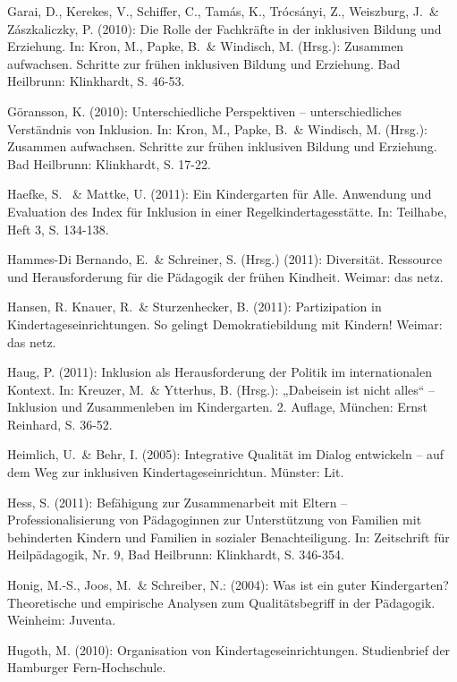 Garai, D., Kerekes, V., Schiffer, C., Tamás,
K., Trócsányi, Z., Weiszburg, J.~\& Zászkaliczky, P. (2010):
Die Rolle der Fachkräfte in der inklusiven Bildung und
Erziehung. In: Kron, M., Papke, B.~\& Windisch, M. (Hrsg.): Zusammen aufwachsen. Schritte zur frühen inklusiven Bildung und Erziehung. Bad Heilbrunn: Klinkhardt, S. 46-53.

Göransson, K. (2010): Unterschiedliche Perspektiven – unterschiedliches Verständnis von Inklusion. In: Kron, M., Papke, B.~\& Windisch, M. (Hrsg.): Zusammen aufwachsen. Schritte zur frühen inklusiven Bildung und Erziehung. Bad Heilbrunn: Klinkhardt, S. 17-22. 

Haefke, S. ~\& Mattke, U. (2011): Ein Kindergarten für Alle. Anwendung und Evaluation des Index für Inklusion in einer Regelkindertagesstätte. In: Teilhabe, Heft 3, S. 134-138.

Hammes-Di Bernando, E.~\& Schreiner, S. (Hrsg.) (2011): Diversität. Ressource und Herausforderung für die Pädagogik der frühen Kindheit. Weimar: das netz. 

Hansen, R. Knauer, R.~\& Sturzenhecker, B. (2011): Partizipation in Kindertageseinrichtungen. So gelingt Demokratiebildung mit Kindern! Weimar: das netz.

Haug, P. (2011): Inklusion als Herausforderung der Politik im internationalen Kontext. In: Kreuzer, M.~\& Ytterhus, B. (Hrsg.): „Dabeisein ist nicht alles“ -- Inklusion und Zusammenleben im Kindergarten. 2. Auflage, München: Ernst Reinhard, S. 36-52.   

Heimlich, U.~\& Behr, I. (2005): Integrative Qualität im Dialog entwickeln – auf dem Weg zur inklusiven Kindertageseinrichtun. Münster: Lit. 


Hess, S. (2011): Befähigung zur Zusammenarbeit mit Eltern -- Professionalisierung von Pädagoginnen zur Unterstützung von Familien mit behinderten Kindern und Familien in sozialer Benachteiligung. In: Zeitschrift für Heilpädagogik, Nr. 9, Bad Heilbrunn: Klinkhardt, S. 346-354.  

Honig, M.-S., Joos, M.~\& Schreiber, N.: (2004): Was ist ein guter Kindergarten? Theoretische und empirische Analysen zum Qualitätsbegriff in der Pädagogik. Weinheim: Juventa.


Hugoth, M. (2010): Organisation von Kindertageseinrichtungen. Studienbrief der Hamburger Fern-Hochschule.

